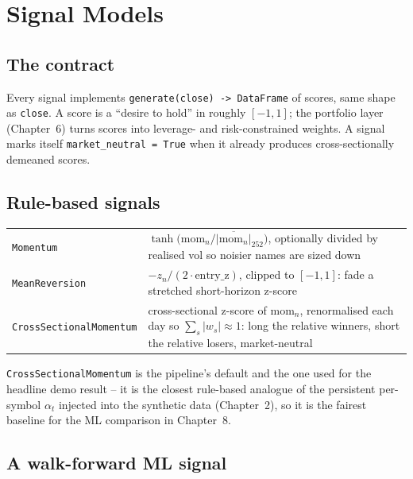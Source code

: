 \chapter{Signal Models}

\section{The contract}

Every signal implements \texttt{generate(close) -\/> DataFrame} of scores, same
shape as \texttt{close}. A score is a ``desire to hold'' in roughly $[-1, 1]$;
the portfolio layer (Chapter~6) turns scores into leverage- and risk-constrained
weights. A signal marks itself \texttt{market\_neutral = True} when it already
produces cross-sectionally demeaned scores.

\section{Rule-based signals}

\begin{table}[h]
\footnotesize
\centering
\begin{tabularx}{\textwidth}{L{3.4cm} X}
\toprule
{} &  \\
\midrule
\texttt{Momentum} & $\tanh\!\big(\mathrm{mom}_n / \overline{|\mathrm{mom}_n|}_{252}\big)$, optionally divided by realised vol so noisier names are sized down \\
\texttt{MeanReversion} & $-z_n / (2\cdot\text{entry\_z})$, clipped to $[-1,1]$: fade a stretched short-horizon z-score \\
\texttt{CrossSectionalMomentum} & cross-sectional z-score of $\mathrm{mom}_n$, renormalised each day so $\sum_s |w_s| \approx 1$: long the relative winners, short the relative losers, market-neutral \\
\bottomrule
\end{tabularx}
\end{table}

\texttt{CrossSectionalMomentum} is the pipeline's default and the one used for
the headline demo result -- it is the closest rule-based analogue of the
persistent per-symbol $\alpha_t$ injected into the synthetic data (Chapter~2),
so it is the fairest baseline for the ML comparison in Chapter~8.

\section{A walk-forward ML signal}

